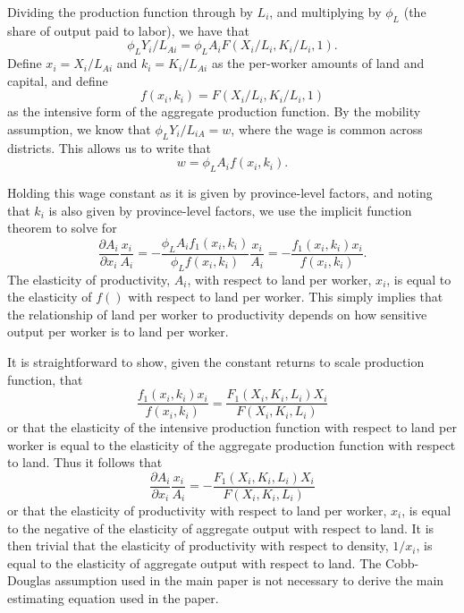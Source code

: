 \documentclass[11pt]{article}
\begin{document}
Dividing the production function through by $L_i$, and multiplying by $\phi_L$ (the share of output paid to labor), we have that
\begin{equation}
    \phi_L Y_i/L_{Ai} = \phi_L A_i F(X_i/L_i,K_i/L_i,1).
\end{equation}
Define $x_i = X_i/L_{Ai}$ and $k_i = K_i/L_{Ai}$ as the per-worker amounts of land and capital, and define
\begin{equation}
    f(x_i,k_i) = F(X_i/L_i,K_i/L_i,1)
\end{equation}
as the intensive form of the aggregate production function. By the mobility assumption, we know that $\phi_L Y_i/L_{iA} = w$, where the wage is common across districts. This allows us to write that 
\begin{equation}
    w = \phi_L A_i f(x_i,k_i).
\end{equation}

Holding this wage constant as it is given by province-level factors, and noting that $k_i$ is also given by province-level factors, we use the implicit function theorem to solve for
\begin{equation}
    \frac{\partial A_i}{\partial x_i} \frac{x_i}{A_i} = - \frac{\phi_L A_i f_1(x_i,k_i)}{\phi_L f(x_i,k_i)}\frac{x_i}{A_i} = - \frac{f_1(x_i,k_i) x_i}{f(x_i,k_i)}.
\end{equation}
The elasticity of productivity, $A_i$, with respect to land per worker, $x_i$, is equal to the elasticity of $f()$ with respect to land per worker. This simply implies that the relationship of land per worker to productivity depends on how sensitive output per worker is to land per worker. 

It is straightforward to show, given the constant returns to scale production function, that
\begin{equation}
    \frac{f_1(x_i,k_i) x_i}{f(x_i,k_i)} = \frac{F_1(X_i,K_i,L_i) X_i}{F(X_i,K_i,L_i)}
\end{equation}
or that the elasticity of the intensive production function with respect to land per worker is equal to the elasticity of the aggregate production function with respect to land. Thus it follows that 
\begin{equation}
    \frac{\partial A_i}{\partial x_i} \frac{x_i}{A_i} = - \frac{F_1(X_i,K_i,L_i) X_i}{F(X_i,K_i,L_i)}
\end{equation}
or that the elasticity of productivity with respect to land per worker, $x_i$, is equal to the negative of the elasticity of aggregate output with respect to land. It is then trivial that the elasticity of productivity with respect to density, $1/x_i$, is equal to the elasticity of aggregate output with respect to land. The Cobb-Douglas assumption used in the main paper is not necessary to derive the main estimating equation used in the paper.
\end{document}
